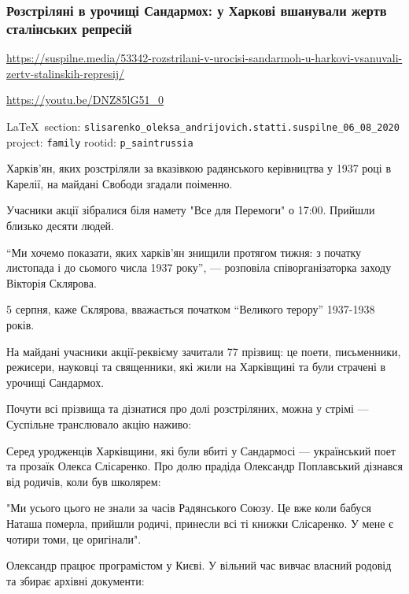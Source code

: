  
 
\subsubsection{Розстріляні в урочищі Сандармох: у Харкові вшанували жертв сталінських репресій}
\url{https://suspilne.media/53342-rozstrilani-v-urocisi-sandarmoh-u-harkovi-vsanuvali-zertv-stalinskih-represij/}

\url{https://youtu.be/DNZ85lG51_0}
  
\vspace{0.5cm}
 {\ifDEBUG\small\LaTeX~section: \verb|slisarenko_oleksa_andrijovich.statti.suspilne_06_08_2020| project: \verb|family| rootid: \verb|p_saintrussia| \fi}
\vspace{0.5cm}

Харків'ян, яких розстріляли за вказівкою радянського керівництва у 1937 році в
Карелії, на майдані Свободи згадали поіменно.

Учасники акції зібралися біля намету "Все для Перемоги" о 17:00. Прийшли
близько десяти людей.

``Ми хочемо показати, яких харків'ян знищили протягом тижня: з початку листопада
і до сьомого числа 1937 року'', --- розповіла співорганізаторка заходу Вікторія
Склярова.

5 серпня, каже Склярова, вважається початком “Великого терору” 1937-1938 років.

На майдані учасники акції-реквієму зачитали 77 прізвищ: це поети, письменники,
режисери, науковці та священники, які жили на Харківщині та були страчені в
урочищі Сандармох.

Почути всі прізвища та дізнатися про долі розстріляних, можна у стрімі ---
Суспільне транслювало акцію наживо:

Серед уродженців Харківщини, які були вбиті у Сандармосі --- український поет
та прозаїк Олекса Слісаренко. Про долю прадіда Олександр Поплавський дізнався
від родичів, коли був школярем:

"Ми усього цього не знали за часів Радянського Союзу. Це вже коли бабуся Наташа
померла, прийшли родичі, принесли всі ті книжки Слісаренко. У мене є чотири
томи, це оригінали".

Олександр працює програмістом у Києві. У вільний час вивчає власний родовід та
збирає архівні документи:

